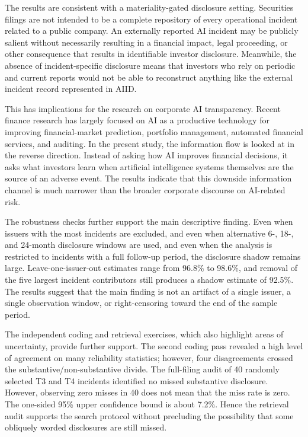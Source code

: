 \documentclass[utf8]{FrontiersinHarvard}
\begin{document}
The results are consistent with a materiality-gated disclosure setting. Securities filings are not intended to be a complete repository of every operational incident related to a public company. An externally reported AI incident may be publicly salient without necessarily resulting in a financial impact, legal proceeding, or other consequence that results in identifiable investor disclosure. Meanwhile, the absence of incident-specific disclosure means that investors who rely on periodic and current reports would not be able to reconstruct anything like the external incident record represented in AIID.

This has implications for the research on corporate AI transparency. Recent finance research has largely focused on AI as a productive technology for improving financial-market prediction, portfolio management, automated financial services, and auditing. In the present study, the information flow is looked at in the reverse direction. Instead of asking how AI improves financial decisions, it asks what investors learn when artificial intelligence systems themselves are the source of an adverse event. The results indicate that this downside information channel is much narrower than the broader corporate discourse on AI-related risk.

The robustness checks further support the main descriptive finding. Even when issuers with the most incidents are excluded, and even when alternative 6-, 18-, and 24-month disclosure windows are used, and even when the analysis is restricted to incidents with a full follow-up period, the disclosure shadow remains large. Leave-one-issuer-out estimates range from 96.8\% to 98.6\%, and removal of the five largest incident contributors still produces a shadow estimate of 92.5\%. The results suggest that the main finding is not an artifact of a single issuer, a single observation window, or right-censoring toward the end of the sample period.

The independent coding and retrieval exercises, which also highlight areas of uncertainty, provide further support. The second coding pass revealed a high level of agreement on many reliability statistics; however, four disagreements crossed the substantive/non-substantive divide. The full-filing audit of 40 randomly selected T3 and T4 incidents identified no missed substantive disclosure. However, observing zero misses in 40 does not mean that the miss rate is zero. The one-sided 95\% upper confidence bound is about 7.2\%. Hence the retrieval audit supports the search protocol without precluding the possibility that some obliquely worded disclosures are still missed.
\end{document}
